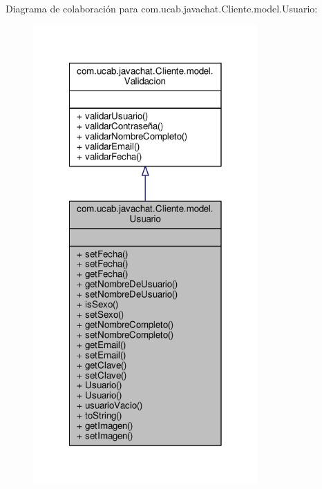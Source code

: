 Diagrama de colaboración para com.\-ucab.\-javachat.\-Cliente.\-model.\-Usuario\-:\nopagebreak
\begin{figure}[H]
\begin{center}
\leavevmode
\includegraphics[width=244pt]{classcom_1_1ucab_1_1javachat_1_1_cliente_1_1model_1_1_usuario__coll__graph}
\end{center}
\end{figure}
